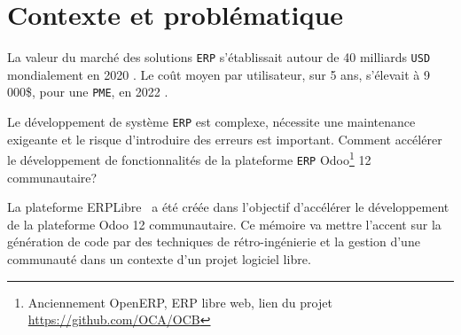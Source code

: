 \label{sec:Introduction}  %


\section{Contexte et problématique}

La valeur du marché des solutions \texttt{ERP} s'établissait autour de 40 milliards \texttt{USD} mondialement en 2020 \cite{mordorintelligence_erp_2023,bigbang_erp_2023}. Le coût moyen par utilisateur, sur 5 ans, s'élevait à 9 000\$, pour une \texttt{PME}, en 2022 \cite{softwarepath_erp_2023}.

Le développement de système \texttt{ERP} est complexe, nécessite une maintenance exigeante et le risque d’introduire des erreurs est important. Comment accélérer le développement de fonctionnalités de la plateforme \texttt{ERP} Odoo\footnote{Anciennement OpenERP, ERP libre web, lien du projet \url{https://github.com/OCA/OCB}} 12 communautaire?

La plateforme ERPLibre~\cite{ref_erplibre} a été créée dans l’objectif d’accélérer le développement de la plateforme Odoo 12 communautaire. Ce mémoire va mettre l’accent sur la génération de code par des techniques de rétro-ingénierie et la gestion d’une communauté dans un contexte d’un projet logiciel libre.




